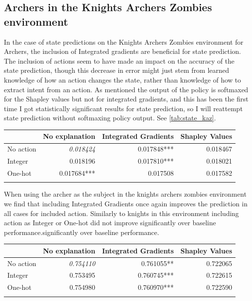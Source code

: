 \documentclass[UKenglish]{uiomasterthesis}
\begin{document}
\subsection{Archers in the Knights Archers Zombies environment}

In the case of state predictions on the Knights Archers Zombies environment for Archers, the inclusion of Integrated gradients are beneficial for state prediction. The inclusion of actions seem to have made an impact on the accuracy of the state prediction, though this decrease in error might just stem from learned knowledge of how an action changes the state, rather than knowledge of how to extract intent from an action. As mentioned the output of the policy is softmaxed for the Shapley values but not for integrated gradients, and this has been the first time I got statistically significant results for state prediction, so I will reattempt state prediction without softmaxing policy output. See \cref{tab:state_kaz}.

\begin{center}
\label{tab:state_kaz}
\begin{tabular}{lrrr}
\toprule
 & No explanation & Integrated Gradients & Shapley Values \\
\midrule
No action & \textit{0.018424} & 0.017848*** & 0.018467 \\
Integer & 0.018196 & 0.017810*** & 0.018021 \\
One-hot & 0.017684*** & 0.017508 & 0.017582 \\
\bottomrule
\addlinespace[2pt]
\multicolumn{3}{l}{\textsuperscript{***}$p<0.001$, 
  \textsuperscript{**}$p<0.01$, 
  \textsuperscript{*}$p<0.05$}
\end{tabular}
\end{center}

When using the archer as the subject in the knights archers zombies environment we find that including Integrated Gradients once again improves the prediction in all cases for included action. Similarly to knights in this environment including action as Integer or One-hot did not improve significantly over baseline performance.significantly over baseline performance.

\begin{center}
\label{tab:event_kaz_arch}
\begin{tabular}{lrrr}
\toprule
 & No explanation & Integrated Gradients & Shapley Values \\
\midrule
No action & \textit{0.754110} & 0.761055** & 0.722065 \\
Integer & 0.753495 & 0.760745*** & 0.722615 \\
One-hot & 0.754980 & 0.760970*** & 0.722590 \\
\bottomrule
\addlinespace[2pt]
\multicolumn{3}{l}{\textsuperscript{***}$p<0.001$, 
  \textsuperscript{**}$p<0.01$, 
  \textsuperscript{*}$p<0.05$}
\end{tabular}
\end{center}
\end{document}
